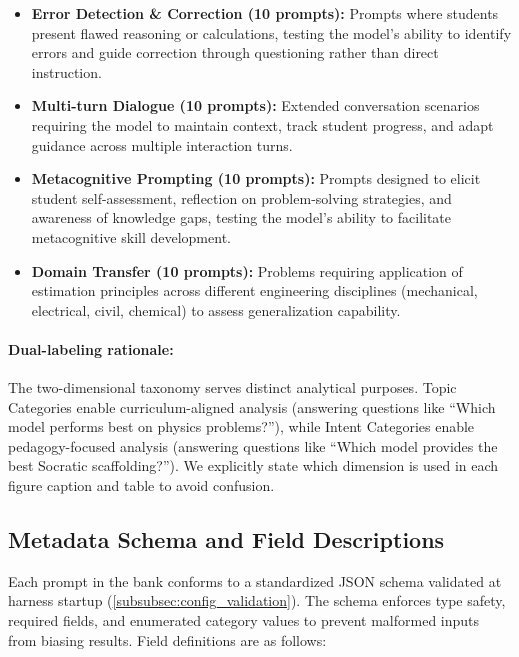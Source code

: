 \begin{itemize}[leftmargin=*]
    \item \textbf{Error Detection \& Correction (10 prompts):} Prompts where students present flawed reasoning or calculations, testing the model's ability to identify errors and guide correction through questioning rather than direct instruction.

    \item \textbf{Multi-turn Dialogue (10 prompts):} Extended conversation scenarios requiring the model to maintain context, track student progress, and adapt guidance across multiple interaction turns.

    \item \textbf{Metacognitive Prompting (10 prompts):} Prompts designed to elicit student self-assessment, reflection on problem-solving strategies, and awareness of knowledge gaps, testing the model's ability to facilitate metacognitive skill development.

    \item \textbf{Domain Transfer (10 prompts):} Problems requiring application of estimation principles across different engineering disciplines (mechanical, electrical, civil, chemical) to assess generalization capability.
\end{itemize}

\paragraph{Dual-labeling rationale:} The two-dimensional taxonomy serves distinct analytical purposes. Topic Categories enable curriculum-aligned analysis (answering questions like ``Which model performs best on physics problems?''), while Intent Categories enable pedagogy-focused analysis (answering questions like ``Which model provides the best Socratic scaffolding?''). We explicitly state which dimension is used in each figure caption and table to avoid confusion.

\subsection{Metadata Schema and Field Descriptions}
\label{app:prompts_schema}

Each prompt in the bank conforms to a standardized JSON schema validated at harness startup (\cref{subsubsec:config_validation}). The schema enforces type safety, required fields, and enumerated category values to prevent malformed inputs from biasing results. Field definitions are as follows:


